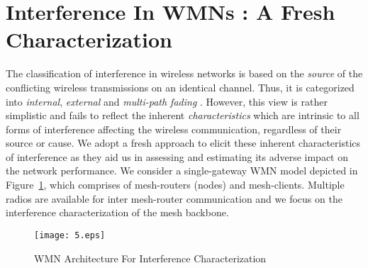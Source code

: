 \documentclass[conference]{IEEEtran}
\begin{document}
\section{Interference In WMNs : A Fresh Characterization}
The classification of interference in wireless networks is based on the \textit{source} of the conflicting wireless transmissions on an identical channel. Thus, it is categorized into \textit{internal}, \textit{external} and \textit{multi-path fading} \cite{26Koutsonikolas}. However, this view is rather simplistic and fails to reflect the inherent \textit{characteristics} which are intrinsic to all forms of interference affecting the wireless communication, regardless of their source or cause. We adopt a fresh approach to elicit these inherent characteristics of interference as they aid us in assessing and estimating its adverse impact on the network performance.
We consider a single-gateway WMN model depicted in \mbox{Figure \ref{WMN}}, which comprises of mesh-routers (nodes) and mesh-clients. Multiple radios are available for inter mesh-router communication and we focus on the interference characterization of the mesh backbone.
 \begin{figure}[htb!]
                \centering
                \texttt{[image: 5.eps]}
                \caption{WMN Architecture For Interference Characterization}
                \label{WMN}
        \end{figure} 
        
\end{document}
